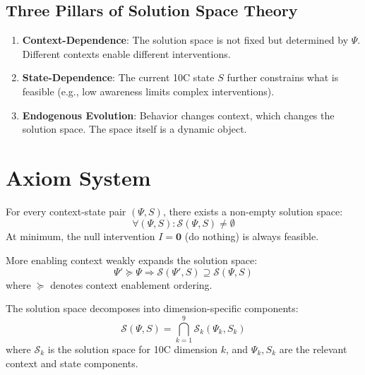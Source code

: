\subsection{Three Pillars of Solution Space Theory}

\begin{enumerate}
    \item \textbf{Context-Dependence}: The solution space is not fixed but determined by $\Psi$. Different contexts enable different interventions.

    \item \textbf{State-Dependence}: The current 10C state $S$ further constrains what is feasible (e.g., low awareness limits complex interventions).

    \item \textbf{Endogenous Evolution}: Behavior changes context, which changes the solution space. The space itself is a dynamic object.
\end{enumerate}

\section{Axiom System}
\label{sec:ss-axioms}

\begin{axiom}
For every context-state pair $(\Psi, S)$, there exists a non-empty solution space:
\begin{equation}
\forall (\Psi, S): \mathcal{S}(\Psi, S) \neq \emptyset
\end{equation}
At minimum, the null intervention $I = \mathbf{0}$ (do nothing) is always feasible.
\end{axiom}

\begin{axiom}
More enabling context weakly expands the solution space:
\begin{equation}
\Psi' \succeq \Psi \Rightarrow \mathcal{S}(\Psi', S) \supseteq \mathcal{S}(\Psi, S)
\end{equation}
where $\succeq$ denotes context enablement ordering.
\end{axiom}

\begin{axiom}
The solution space decomposes into dimension-specific components:
\begin{equation}
\mathcal{S}(\Psi, S) = \bigcap_{k=1}^{9} \mathcal{S}_k(\Psi_k, S_k)
\end{equation}
where $\mathcal{S}_k$ is the solution space for 10C dimension $k$, and $\Psi_k, S_k$ are the relevant context and state components.
\end{axiom}

